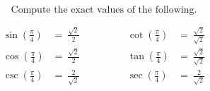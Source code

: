 $$
\text{Compute the exact values of the following.}
$$

$$
\begin{align*}
  \sin\left(\frac{\pi}{4}\right) &=\ \frac{\sqrt{2}}{2} \qquad&\qquad \cot\left(\frac{\pi}{4}\right) &=\ \frac{\sqrt{2}}{\sqrt{2}} \\[2ex]
  \cos\left(\frac{\pi}{4}\right) &=\ \frac{\sqrt{2}}{2} \qquad&\qquad \tan\left(\frac{\pi}{4}\right) &=\ \frac{\sqrt{2}}{\sqrt{2}} \\[2ex]
  \csc\left(\frac{\pi}{4}\right) &=\ \frac{2}{\sqrt{2}} \qquad&\qquad \sec\left(\frac{\pi}{4}\right) &=\ \frac{2}{\sqrt{2}}
\end{align*}
$$
